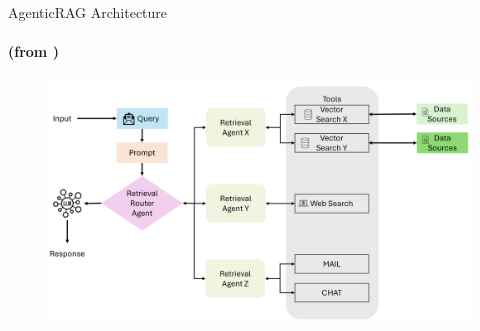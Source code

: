\begin{frame}{AgenticRAG Architecture}
\framesubtitle{(from \textcite{Singh2025})}
    \begin{figure}
        \centering
        \includegraphics[width=.9\textwidth]{../img/architecture/multi-agent-agentic-rag.png}
    \end{figure}
    \centering
\end{frame}